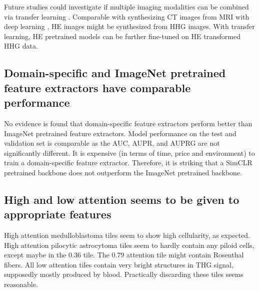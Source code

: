 Future studies could investigate if multiple imaging modalities can be combined via transfer learning .
Comparable with synthesizing CT images from MRI with deep learning , HE images might be synthesized from HHG images.
With transfer learning, HE pretrained models can be further fine-tuned on HE transformed HHG data.

\subsection{Domain-specific and ImageNet pretrained feature extractors have comparable performance}
No evidence is found that domain-specific feature extractors perform better than ImageNet pretrained feature extractors.
Model performance on the test and validation set is comparable as the AUC, AUPR, and AUPRG are not significantly different.
It is expensive (in terms of time, price and environment) to train a domain-specific feature extractor.
Therefore, it is striking that a SimCLR pretrained backbone does not outperform the ImageNet pretrained backbone.

\subsection{High and low attention seems to be given to appropriate features}
High attention medulloblastoma tiles seem to show high cellularity, as expected.
High attention pilocytic astrocytoma tiles seem to hardly contain any piloid cells, except maybe in the 0.36 tile.
The 0.79 attention tile might contain Rosenthal fibers.
All low attention tiles contain very bright structures in THG signal, supposedly mostly produced by blood.
Practically discarding these tiles seems reasonable.
